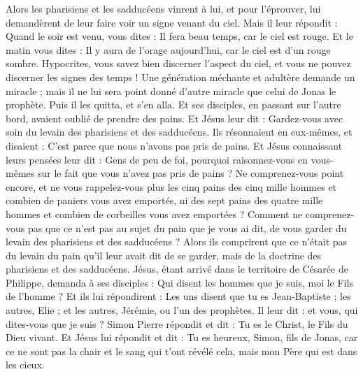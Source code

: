 \begin{multicols}{2}
\VerseOne{}Alors les pharisiens et les sadducéens vinrent à lui, et pour l'éprouver, lui demandèrent de leur faire voir un signe venant du ciel.
Mais il leur répondit : Quand le soir est venu, vous dites : Il fera beau temps, car le ciel est rouge.
Et le matin vous dites : Il y aura de l'orage aujourd'hui, car le ciel est d'un rouge sombre. Hypocrites, vous savez bien discerner l'aspect du ciel, et vous ne pouvez discerner les signes des temps !
Une génération méchante et adultère demande un miracle ; mais il ne lui sera point donné d'autre miracle que celui de Jonas le prophète. Puis il les quitta, et s'en alla.
Et ses disciples, en passant sur l'autre bord, avaient oublié de prendre des pains.
Et Jésus leur dit : Gardez-vous avec soin du levain des pharisiens et des sadducéens.
Ils résonnaient en eux-mêmes, et disaient : C'est parce que nous n'avons pas pris de pains.
Et Jésus connaissant leurs pensées leur dit : Gens de peu de foi, pourquoi raisonnez-vous en vous-mêmes sur le fait que vous n'avez pas pris de pains ?
Ne comprenez-vous point encore, et ne vous rappelez-vous plus les cinq pains des cinq mille hommes et combien de paniers vous avez emportés,
ni des sept pains des quatre mille hommes et combien de corbeilles vous avez emportées ?
Comment ne comprenez-vous pas que ce n'est pas au sujet du pain que je vous ai dit, de vous garder du levain des pharisiens et des sadducéens ?
Alors ils comprirent que ce n'était pas du levain du pain qu'il leur avait dit de se garder, mais de la doctrine des pharisiens et des sadducéens.
Jésus, étant arrivé dans le territoire de Césarée de Philippe, demanda à ses disciples : Qui disent les hommes que je suis, moi le Fils de l'homme ?
Et ils lui répondirent : Les uns disent que tu es Jean-Baptiste ; les autres, Elie ; et les autres, Jérémie, ou l'un des prophètes.
Il leur dit : et vous, qui dites-vous que je suis ?
Simon Pierre répondit et dit : Tu es le Christ, le Fils du Dieu vivant.
Et Jésus lui répondit et dit : Tu es heureux, Simon, fils de Jonas, car ce ne sont pas la chair et le sang qui t'ont révélé cela, mais mon Père qui est dans les cieux.

\end{multicols}
